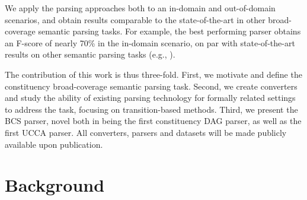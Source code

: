 \documentclass[11pt]{article}
\newcommand{\secref}[1]{Section~\ref{#1}}
\begin{document}
We apply the parsing approaches both to an in-domain and out-of-domain scenarios,
and obtain results comparable to the state-of-the-art in other broad-coverage semantic parsing
tasks. For example, the best performing parser obtains an F-score of nearly 70\% in
the in-domain scenario, on par with state-of-the-art results on other semantic
parsing tasks (e.g., \cite{artzi2015broad}). 


The contribution of this work is thus three-fold.
First, we motivate and define the constituency broad-coverage semantic parsing task.
Second, we create converters and study the ability of existing parsing technology
for formally related settings to address the task, focusing on transition-based methods.
Third, we present the BCS parser, novel both in being the first constituency DAG parser, as well as the first UCCA parser. 
All converters, parsers and datasets will be made publicly available upon publication.

\section{Background}\label{sec:related}
\end{document}
